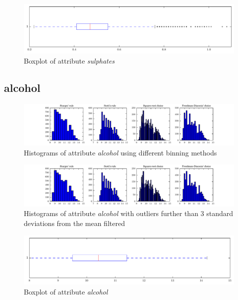 \documentclass{report}
\begin{document}
\begin{figure}[H]
\includegraphics[width=\textwidth]{boxplots/sulphates.pdf}
\caption{Boxplot of attribute \emph{sulphates}}\end{figure}

\newpage\subsection{alcohol}
\begin{figure}[H]
\includegraphics[width=\textwidth]{histograms/alcohol.pdf}
\caption{Histograms of attribute \emph{alcohol} using different binning methods}\end{figure}

\begin{figure}[H]
\includegraphics[width=\textwidth]{histograms/alcohol_filtered.pdf}
\caption{Histograms of attribute \emph{alcohol} with outliers further than 3 standard deviations from the mean filtered}\n\end{figure}

\begin{figure}[H]
\includegraphics[width=\textwidth]{boxplots/alcohol.pdf}
\caption{Boxplot of attribute \emph{alcohol}}\end{figure}
\end{document}

